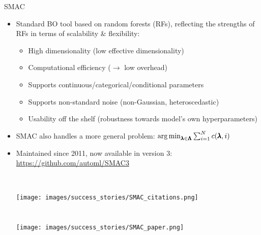 \begin{frame}[c]{SMAC  }

\begin{itemize}
    \item Standard BO tool based on random forests (RFs), reflecting the strengths of RFs in terms of \alert{scalability \& flexibility}:
    \begin{itemize}
        \item High dimensionality (low effective dimensionality)
        \item Computational efficiency ($\rightarrow$ low overhead)
        \item Supports continuous/categorical/conditional parameters
        \item Supports non-standard noise (non-Gaussian, heteroscedastic)
        \item Usability off the shelf (robustness towards model's own hyperparameters)
    \end{itemize}

\pause
\smallskip
    \item SMAC also handles a more general problem:
    $\operatorname*{arg\,min}_{\pmb{\lambda}\in\pmb{\Lambda}} \sum_{i=1}^N c(\pmb{\lambda},i)$
\pause
\smallskip
    \item Maintained since 2011, now available in version 3: \url{https://github.com/automl/SMAC3}

\begin{columns}
~\\
\texttt{[image: images/success\_stories/SMAC\_citations.png]}
~\\
~\\
~\\
\texttt{[image: images/success\_stories/SMAC\_paper.png]}
~\\
\end{columns}    
\end{itemize}
\end{frame}


